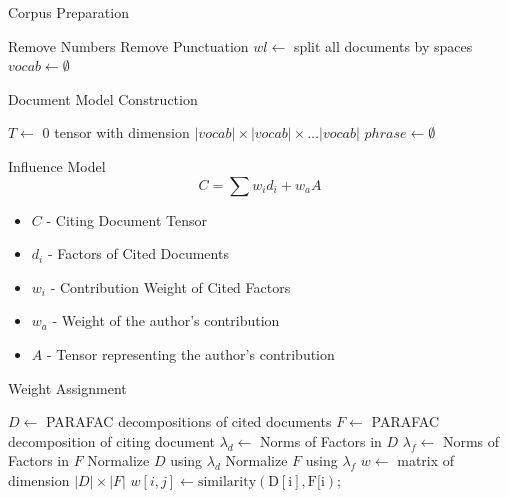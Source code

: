 \documentclass[handout]{beamer}
\begin{document}
\begin{frame}{Corpus Preparation}
\begin{algorithm}[H]
    Remove Numbers\;
    Remove Punctuation\;
    $wl \leftarrow $ split all documents by spaces\;
    $vocab \leftarrow \emptyset$\;
     {
    }
\end{algorithm}
\end{frame}

\begin{frame}{Document Model Construction}
\begin{algorithm}[H]
    $T \leftarrow$ 0 tensor with dimension $|vocab| \times |vocab| \times \ldots
    |vocab|$\;
    $phrase \leftarrow \emptyset$ \;
\end{algorithm}
\end{frame}

\begin{frame}{Influence Model}
    \[
    C = \sum w_id_i + w_a A
    \]
    \begin{itemize}[<+->]
        \item $C$ - Citing Document Tensor
        \item $d_i$ - Factors of Cited Documents
        \item $w_i$ - Contribution Weight of Cited Factors
        \item $w_a$ - Weight of the author's contribution
        \item $A$ - Tensor representing the author's contribution
    \end{itemize}
\end{frame}

\begin{frame}{Weight Assignment}
\begin{algorithm}[H]
    $D \leftarrow$ PARAFAC decompositions of cited documents\;
    $F \leftarrow$ PARAFAC decomposition of citing document\;
    $\lambda_d \leftarrow $ Norms of Factors in $D$\;
    $\lambda_f \leftarrow $ Norms of Factors in $F$\;
    Normalize $D$ using $\lambda_d$\;
    Normalize $F$ using $\lambda_f$\;
    $w \leftarrow $ matrix of dimension $|D| \times |F|$\;
     {
         {
            $w[i,j] \leftarrow \mathrm{similarity(D[i], F[i)}$;
        }
    }
\end{algorithm}
\end{frame}
\end{document}
